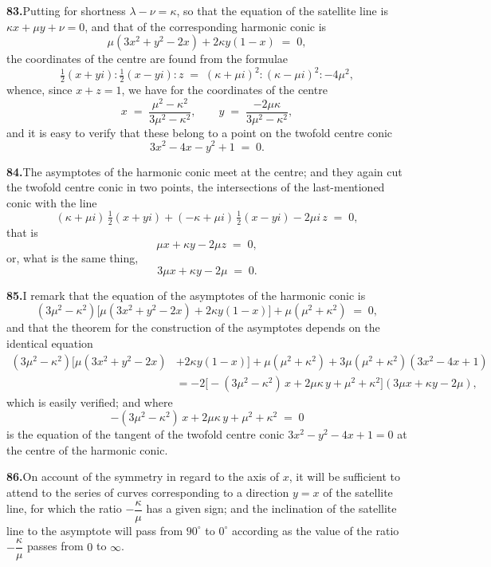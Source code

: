 \documentclass[11pt]{article}
\begin{document}
\medskip
\textbf{83.}\quad Putting for shortness $\lambda - \nu = \kappa$, so that the equation of the satellite line is $\kappa x + \mu y + \nu = 0$, and that of the corresponding harmonic conic is
\[
\mu(3 x^{2} + y^{2} - 2 x) + 2 \kappa y(1 - x) \;=\; 0,
\]
the coordinates of the centre are found from the formulae
\[
\tfrac{1}{2}(x + yi) : \tfrac{1}{2}(x - yi) : z \;=\; (\kappa + \mu i)^{2} : (\kappa - \mu i)^{2} : -4\mu^{2},
\]
whence, since $x + z = 1$, we have for the coordinates of the centre
\[
x \;=\; \frac{\mu^{2} - \kappa^{2}}{3 \mu^{2} - \kappa^{2}},\qquad y \;=\; \frac{-2 \mu \kappa}{3 \mu^{2} - \kappa^{2}},
\]
and it is easy to verify that these belong to a point on the twofold centre conic
\[
3 x^{2} - 4 x - y^{2} + 1 \;=\; 0.
\]

\medskip
\textbf{84.}\quad The asymptotes of the harmonic conic meet at the centre; and they again cut the twofold centre conic in two points, the intersections of the last-mentioned conic with the line
\[
(\kappa + \mu i)\,\tfrac{1}{2}(x + y i) + (-\kappa + \mu i)\,\tfrac{1}{2}(x - y i) - 2 \mu i\, z \;=\; 0,
\]
that is
\[
\mu x + \kappa y - 2 \mu z \;=\; 0,
\]
or, what is the same thing,
\[
3 \mu x + \kappa y - 2 \mu \;=\; 0.
\]

\medskip
\textbf{85.}\quad I remark that the equation of the asymptotes of the harmonic conic is
\[
(3\mu^{2} - \kappa^{2})\bigl[\mu(3 x^{2} + y^{2} - 2 x) + 2 \kappa y(1 - x)\bigr] + \mu(\mu^{2} + \kappa^{2}) \;=\; 0,
\]
and that the theorem for the construction of the asymptotes depends on the identical equation
\begin{align*}
(3 \mu^{2} - \kappa^{2})\bigl[\mu(3 x^{2} + y^{2} - 2 x) &+ 2 \kappa y(1 - x)\bigr] + \mu(\mu^{2} + \kappa^{2}) + 3 \mu(\mu^{2} + \kappa^{2})(3 x^{2} - 4 x + 1)\\
&= -2\bigl[-(3\mu^{2} - \kappa^{2})\,x + 2 \mu \kappa\, y + \mu^{2} + \kappa^{2}\bigr](3 \mu x + \kappa y - 2 \mu),
\end{align*}
which is easily verified; and where
\[
-(3 \mu^{2} - \kappa^{2})\, x + 2 \mu \kappa\, y + \mu^{2} + \kappa^{2} \;=\; 0
\]
is the equation of the tangent of the twofold centre conic $3 x^{2} - y^{2} - 4 x + 1 = 0$ at the centre of the harmonic conic.

\medskip
\textbf{86.}\quad On account of the symmetry in regard to the axis of $x$, it will be sufficient to attend to the series of curves corresponding to a direction $y = x$ of the satellite line, for which the ratio $-\dfrac{\kappa}{\mu}$ has a given sign; and the inclination of the satellite line to the asymptote will pass from $90^{\circ}$ to $0^{\circ}$ according as the value of the ratio $-\dfrac{\kappa}{\mu}$ passes from $0$ to $\infty$.
\end{document}
